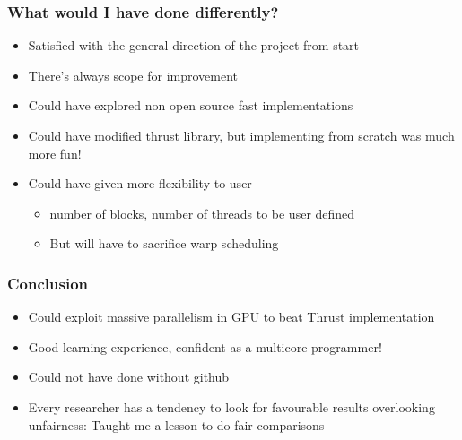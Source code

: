\documentclass[mathserif]{beamer}
\begin{document}
\begin{frame}                                                                                                                                                                          
\frametitle{What would I have done differently?}
\begin{center}
\begin{itemize}
\item Satisfied with the general direction of the project from start
\item There's always scope for improvement
\item Could have explored non open source fast implementations 
\item Could have modified thrust library, but implementing from scratch was much more fun!
\item Could have given more flexibility to user 
\begin{itemize}
\item number of blocks, number of threads to be user defined         
\item But will have to sacrifice warp scheduling  
\end{itemize}
\end{itemize}
\end{center}
\end{frame}             

\begin{frame}                                                                                                                                                                          
\frametitle{Conclusion}
\begin{center}
\begin{itemize}
\item Could exploit massive parallelism in GPU to beat Thrust implementation 
\item Good learning experience, confident as a multicore programmer!
\item Could not have done without github
\item Every researcher has a tendency to look for favourable results overlooking unfairness: Taught me a lesson to do fair comparisons 
\end{itemize}
\end{center}
\end{frame}             
\end{document}
